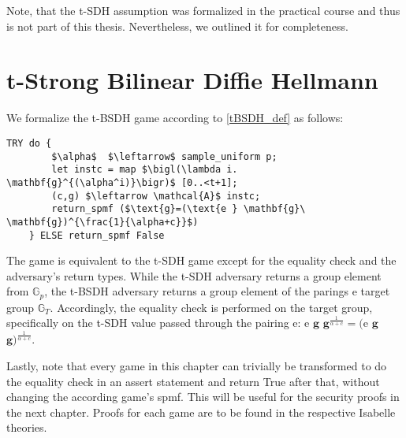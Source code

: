 Note, that the t-SDH assumption was formalized in the practical course and thus is not part of this thesis. Nevertheless, we outlined it for completeness. 

\section*{t-Strong Bilinear Diffie Hellmann}
We formalize the t-BSDH game according to \ref{tBSDH_def} as follows: 
\begin{lstlisting}[language=isabelle]
    TRY do {
        $\alpha$  $\leftarrow$ sample_uniform p;
        let instc = map $\bigl(\lambda i. \mathbf{g}^{(\alpha^i)}\bigr)$ [0..<t+1];
        (c,g) $\leftarrow \mathcal{A}$ instc;
        return_spmf ($\text{g}=(\text{e } \mathbf{g}\ \mathbf{g})^{\frac{1}{\alpha+c}}$)
    } ELSE return_spmf False
\end{lstlisting}
The game is equivalent to the t-SDH game except for the equality check and the adversary's return types. 
While the t-SDH adversary returns a group element from $\mathbb{G}_p$, the t-BSDH adversary returns a group element of the parings e target group $\mathbb{G}_T$. Accordingly, the equality check is performed on the target group, specifically on the t-SDH value passed through the pairing e: e $\mathbf{g}$ $\mathbf{g}^{\frac{1}{\alpha+c}} = \text{(e}$ $\mathbf{g}$ $\mathbf{g})^{\frac{1}{\alpha+c}}$.

Lastly, note that every game in this chapter can trivially be transformed to do the equality check in an assert statement and return True after that, without changing the according game's spmf. This will be useful for the security proofs in the next chapter. Proofs for each game are to be found in the respective Isabelle theories.
